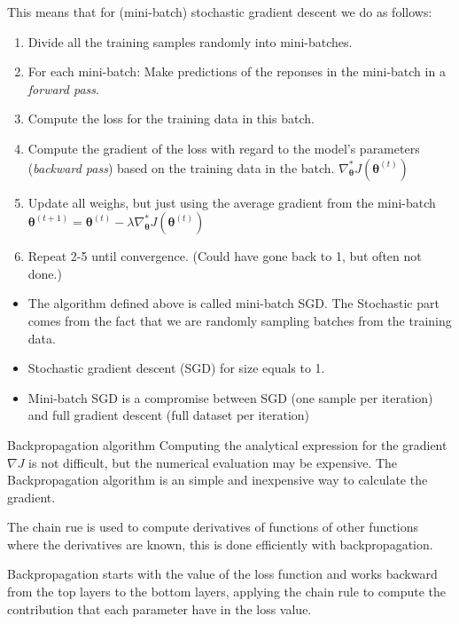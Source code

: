 \documentclass[
  ignorenonframetext,
]{beamer}
\providecommand{\tightlist}{%
  \setlength{\itemsep}{0pt}\setlength{\parskip}{0pt}}
\begin{document}
\begin{frame}
This means that for (mini-batch) stochastic gradient descent we do as
follows:

\begin{enumerate}
\tightlist
\item
  Divide all the training samples randomly into mini-batches.
\item
  For each mini-batch: Make predictions of the reponses in the
  mini-batch in a \emph{forward pass}.
\item
  Compute the loss for the training data in this batch.
\item
  Compute the gradient of the loss with regard to the model's parameters
  (\emph{backward pass}) based on the training data in the batch.
  \(\nabla_{\boldsymbol \theta}^* J({\boldsymbol \theta}^{(t)})\)
\item
  Update all weighs, but just using the average gradient from the
  mini-batch
  \({\boldsymbol \theta}^{(t+1)}={\boldsymbol \theta}^{(t)} - \lambda \nabla_{\boldsymbol \theta} ^* J({\boldsymbol \theta}^{(t)})\)
\item
  Repeat 2-5 until convergence. (Could have gone back to 1, but often
  not done.)
\end{enumerate}
\end{frame}

\begin{frame}
\begin{itemize}
\tightlist
\item
  The algorithm defined above is called mini-batch SGD. The Stochastic
  part comes from the fact that we are randomly sampling batches from
  the training data.
\item
  Stochastic gradient descent (SGD) for size equals to 1.
\item
  Mini-batch SGD is a compromise between SGD (one sample per iteration)
  and full gradient descent (full dataset per iteration)
\end{itemize}
\end{frame}

\begin{frame}
\begin{block}{Backpropagation algorithm}
\protect\hypertarget{backpropagation-algorithm}{}
Computing the analytical expression for the gradient \(\nabla J\) is not
difficult, but the numerical evaluation may be expensive. The
Backpropagation algorithm is an simple and inexpensive way to calculate
the gradient.

The chain rue is used to compute derivatives of functions of other
functions where the derivatives are known, this is done efficiently with
backpropagation.

Backpropagation starts with the value of the loss function and works
backward from the top layers to the bottom layers, applying the chain
rule to compute the contribution that each parameter have in the loss
value.
\end{block}
\end{frame}
\end{document}
